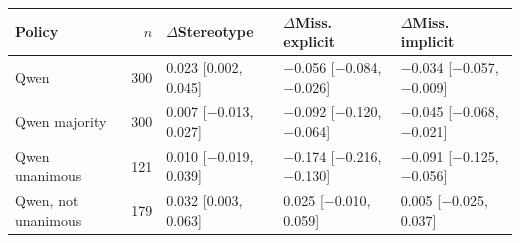 

\footnotesize
\begin{tabular*}{\textwidth}{@{\extracolsep{\fill}}lrlll}
\toprule
Policy & $n$ & $\Delta$Stereotype & $\Delta$Miss. explicit & $\Delta$Miss. implicit\\
\midrule
Qwen & 300 & 0.023 [0.002, 0.045] & $-$0.056 [$-$0.084, $-$0.026] & $-$0.034 [$-$0.057, $-$0.009]\\
Qwen majority & 300 & 0.007 [$-$0.013, 0.027] & $-$0.092 [$-$0.120, $-$0.064] & $-$0.045 [$-$0.068, $-$0.021]\\
Qwen unanimous & 121 & 0.010 [$-$0.019, 0.039] & $-$0.174 [$-$0.216, $-$0.130] & $-$0.091 [$-$0.125, $-$0.056]\\
Qwen, not unanimous & 179 & 0.032 [0.003, 0.063] & 0.025 [$-$0.010, 0.059] & 0.005 [$-$0.025, 0.037]\\
\bottomrule
\end{tabular*}
